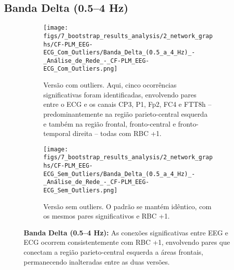 \subsection{Banda Delta (0.5–4 Hz)}
\begin{figure}[H]
    \centering
    \begin{subfigure}[b]{0.48\textwidth}
        \texttt{[image: figs/7\_bootstrap\_results\_analysis/2\_network\_graphs/CF-PLM\_EEG-ECG\_Com\_Outliers/Banda\_Delta\_(0.5\_a\_4\_Hz)\_-\_Análise\_de\_Rede\_-\_CF-PLM\_EEG-ECG\_Com\_Outliers.png]}
        \caption{\small Versão com outliers. Aqui, cinco ocorrências significativas foram identificadas, envolvendo pares entre o ECG e os canais CP3, P1, Fp2, FC4 e FTT8h – predominantemente na região parieto-central esquerda e também na região frontal, fronto-central e fronto-temporal direita – todas com RBC +1.}
    \end{subfigure}
    \hfill
    \begin{subfigure}[b]{0.48\textwidth}
        \texttt{[image: figs/7\_bootstrap\_results\_analysis/2\_network\_graphs/CF-PLM\_EEG-ECG\_Sem\_Outliers/Banda\_Delta\_(0.5\_a\_4\_Hz)\_-\_Análise\_de\_Rede\_-\_CF-PLM\_EEG-ECG\_Sem\_Outliers.png]}
        \caption{\small Versão sem outliers. O padrão se mantém idêntico, com os mesmos pares significativos e RBC +1.}
    \end{subfigure}
    \caption[Análise de Rede – Banda Delta (CF‐PLM EEG–ECG)]{\small \textbf{Banda Delta (0.5–4 Hz):} As conexões significativas entre EEG e ECG ocorrem consistentemente com RBC +1, envolvendo pares que conectam a região parieto-central esquerda a áreas frontais, permanecendo inalteradas entre as duas versões.}
    \label{fig:rede_delta_cfplm}
\end{figure}

